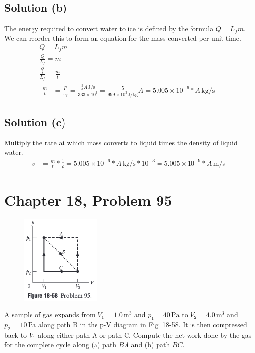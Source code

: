 \documentclass{article}
\newcommand{\E}[1]{\times 10^{#1}}
\begin{document}
        \subsection{Solution (b)}
            The energy required to convert water to ice is defined by the formula $Q = L_f m$.
            We can reorder this to form an equation for the mass converted per unit time.
            \begin{gather}
                Q   =   L_f m\\
                \frac{Q}{L_f}   =   m\\
                \frac{\frac{Q}{t}}{L_f} =   \frac{m}{t}\\
                \begin{align}
                    \frac{m}{t} &=  \frac{P}{L_f}
                        =   \frac{\frac{5}{3}A\,\unit{\joule/\second}}{333\E{3}}
                        =   \frac{5}{999\E{3}\,\unit{\joule/\kilo\gram}}A
                        =   \boxed{5.005\E{-6} * A\,\unit{\kilo\gram/\second}}
                \end{align}
            \end{gather}

        \subsection{Solution (c)}
            Multiply the rate at which mass converts to liquid times the density of liquid water.
            \begin{align}
                v   &=  \frac{m}{t} * \frac{1}{\rho}
                    =   5.005\E{-6} * A\,\unit{\kilo\gram/\second} * 10^{-3}
                    =   \boxed{5.005\E{-9} * A\,\unit{\meter/\second}}
            \end{align}

    \pagebreak
    \section{Chapter 18, Problem 95}
        \begin{figure}
            \vspace{-55pt}
            \includegraphics[width=0.35\textwidth]{picture_18-58.png} 
        \end{figure}
        A sample of gas expands from $V_1 = 1.0\,\unit{\meter^3}$ and $p_1 = 40\,\unit{\pascal}$ to $V_2 = 4.0\,\unit{\meter^3}$ and $p_2 = 10\,\unit{\pascal}$ along path B in the p-V diagram in Fig. 18-58.
        It is then compressed back to $V_1$ along either path A or path C. 
        Compute the net work done by the gas for the complete cycle along (a) path $BA$ and (b) path $BC$.
\end{document}
